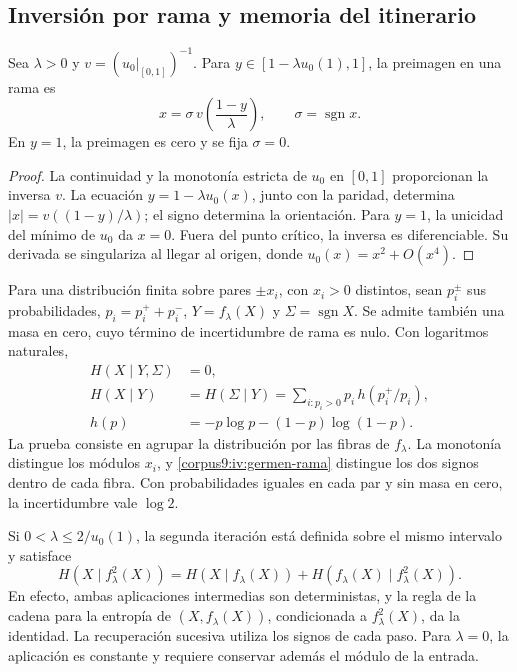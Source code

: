 \subsection{Inversión por rama y memoria del itinerario}
\begin{proposition}
\label{corpus9:iv:germen-inversa}
Sea \(\lambda>0\) y
\(v=(u_0|_{[0,1]})^{-1}\). Para
\(y\in[1-\lambda u_0(1),1]\), la preimagen en una rama es
\begin{equation}
 x=\sigma\,v\!\left(\frac{1-y}{\lambda}\right),
 \qquad \sigma=\operatorname{sgn}x.
 \label{corpus9:iv:germen-rama}
\end{equation}
En \(y=1\), la preimagen es cero y se fija \(\sigma=0\).
\end{proposition}
\begin{proof}
La continuidad y la monotonía estricta de \(u_0\) en
\([0,1]\) proporcionan la inversa \(v\).
La ecuación \(y=1-\lambda u_0(x)\), junto con la paridad,
determina \(|x|=v((1-y)/\lambda)\); el signo determina la
orientación. Para \(y=1\), la unicidad del mínimo de \(u_0\)
da \(x=0\). Fuera del punto crítico, la inversa es diferenciable.
Su derivada se singulariza al llegar al origen, donde
\(u_0(x)=x^2+O(x^4)\).
\end{proof}

Para una distribución finita sobre pares \(\pm x_i\), con
\(x_i>0\) distintos, sean \(p_i^\pm\) sus probabilidades,
\(p_i=p_i^++p_i^-\), \(Y=f_\lambda(X)\) y
\(\Sigma=\operatorname{sgn}X\). Se admite también una masa
en cero, cuyo término de incertidumbre de rama es nulo. Con
logaritmos naturales,
\begin{align}
 H(X\mid Y,\Sigma)&=0,\\
 H(X\mid Y)&=H(\Sigma\mid Y)
   =\sum_{i:p_i>0}p_i\,h(p_i^+/p_i),\\
 h(p)&=-p\log p-(1-p)\log(1-p).
 \label{corpus9:iv:germen-entropia}
\end{align}
La prueba consiste en agrupar la distribución por las fibras
de \(f_\lambda\). La monotonía distingue los módulos \(x_i\),
y \eqref{corpus9:iv:germen-rama} distingue los dos signos
dentro de cada fibra. Con probabilidades iguales en cada par
y sin masa en cero, la incertidumbre vale \(\log2\).

Si \(0<\lambda\leq2/u_0(1)\), la segunda iteración está
definida sobre el mismo intervalo y satisface
\[
 H(X\mid f_\lambda^2(X))
 =H(X\mid f_\lambda(X))
  +H(f_\lambda(X)\mid f_\lambda^2(X)).
\]
En efecto, ambas aplicaciones intermedias son deterministas,
y la regla de la cadena para la entropía de
\((X,f_\lambda(X))\), condicionada a \(f_\lambda^2(X)\),
da la identidad. La recuperación sucesiva utiliza los signos
de cada paso. Para \(\lambda=0\), la aplicación es constante
y requiere conservar además el módulo de la entrada.

